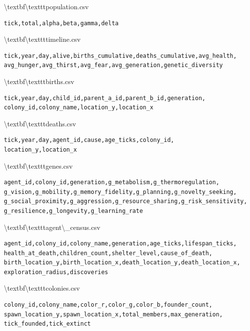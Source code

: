 \documentclass[11pt,a4paper]{article}
\begin{document}
\textbackslash{}textbf{\textbackslash{}texttt{population.csv}}
\begin{lstlisting}[language=Python]
tick,total,alpha,beta,gamma,delta
\end{lstlisting}

\textbackslash{}textbf{\textbackslash{}texttt{timeline.csv}}
\begin{lstlisting}[language=Python]
tick,year,day,alive,births_cumulative,deaths_cumulative,avg_health,
avg_hunger,avg_thirst,avg_fear,avg_generation,genetic_diversity
\end{lstlisting}

\textbackslash{}textbf{\textbackslash{}texttt{births.csv}}
\begin{lstlisting}[language=Python]
tick,year,day,child_id,parent_a_id,parent_b_id,generation,
colony_id,colony_name,location_y,location_x
\end{lstlisting}

\textbackslash{}textbf{\textbackslash{}texttt{deaths.csv}}
\begin{lstlisting}[language=Python]
tick,year,day,agent_id,cause,age_ticks,colony_id,
location_y,location_x
\end{lstlisting}

\textbackslash{}textbf{\textbackslash{}texttt{genes.csv}}
\begin{lstlisting}[language=Python]
agent_id,colony_id,generation,g_metabolism,g_thermoregulation,
g_vision,g_mobility,g_memory_fidelity,g_planning,g_novelty_seeking,
g_social_proximity,g_aggression,g_resource_sharing,g_risk_sensitivity,
g_resilience,g_longevity,g_learning_rate
\end{lstlisting}

\textbackslash{}textbf{\textbackslash{}texttt{agent\textbackslash{}\_census.csv}}
\begin{lstlisting}[language=Python]
agent_id,colony_id,colony_name,generation,age_ticks,lifespan_ticks,
health_at_death,children_count,shelter_level,cause_of_death,
birth_location_y,birth_location_x,death_location_y,death_location_x,
exploration_radius,discoveries
\end{lstlisting}

\textbackslash{}textbf{\textbackslash{}texttt{colonies.csv}}
\begin{lstlisting}[language=Python]
colony_id,colony_name,color_r,color_g,color_b,founder_count,
spawn_location_y,spawn_location_x,total_members,max_generation,
tick_founded,tick_extinct
\end{lstlisting}
\end{document}
